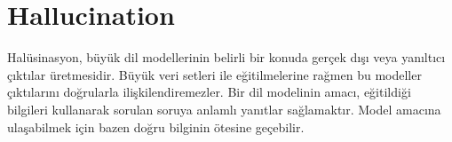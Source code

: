 \section{Hallucination}
Halüsinasyon, büyük dil modellerinin belirli bir konuda gerçek dışı veya yanıltıcı çıktılar üretmesidir. Büyük veri setleri ile eğitilmelerine rağmen bu modeller çıktılarını doğrularla ilişkilendiremezler. Bir dil modelinin amacı, eğitildiği bilgileri kullanarak sorulan soruya anlamlı yanıtlar sağlamaktır. Model amacına ulaşabilmek için bazen doğru bilginin ötesine geçebilir.

\newpage